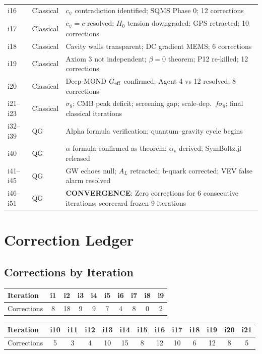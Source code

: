 \documentclass[11pt,a4paper]{article}
\begin{document}
\begin{center}
\begin{tabular}{llp{8cm}}
i16 & Classical & $c_\psi$ contradiction identified; SQMS Phase 0; 12 corrections \\
i17 & Classical & $c_\psi = c$ resolved; $H_0$ tension downgraded; GPS retracted; 10 corrections \\
i18 & Classical & Cavity walls transparent; DC gradient MEMS; 6 corrections \\
i19 & Classical & Axiom 3 not independent; $\beta = 0$ theorem; P12 re-killed; 12 corrections \\
i20 & Classical & Deep-MOND $G_{\rm eff}$ confirmed; Agent 4 vs 12 resolved; 8 corrections \\
i21--i23 & Classical & $\sigma_8$; CMB peak deficit; screening gap; scale-dep.\ $f\sigma_8$; final classical iterations \\
i32--i39 & QG & Alpha formula verification; quantum--gravity cycle begins \\
i40 & QG & $\alpha$ formula confirmed as theorem; $\alpha_s$ derived; SymBoltz.jl released \\
i41--i45 & QG & GW echoes null; $A_L$ retracted; b-quark corrected; VEV false alarm resolved \\
i46--i51 & QG & \textbf{CONVERGENCE}: Zero corrections for 6 consecutive iterations; scorecard frozen 9 iterations \\
\bottomrule
\end{tabular}
\end{center}


\section{Correction Ledger}\label{app:corrections}

\subsection{Corrections by Iteration}

\begin{center}
\begin{tabular}{lccccccccc}
\toprule
Iteration & i1 & i2 & i3 & i4 & i5 & i6 & i7 & i8 & i9 \\
\midrule
Corrections & 8 & 18 & 9 & 9 & 7 & 4 & 8 & 0 & 2 \\
\bottomrule
\end{tabular}
\end{center}

\begin{center}
\begin{tabular}{lcccccccccccc}
\toprule
Iteration & i10 & i11 & i12 & i13 & i14 & i15 & i16 & i17 & i18 & i19 & i20 & i21 \\
\midrule
Corrections & 5 & 3 & 4 & 10 & 15 & 8 & 12 & 10 & 6 & 12 & 8 & 5 \\
\bottomrule
\end{tabular}
\end{center}
\end{document}

